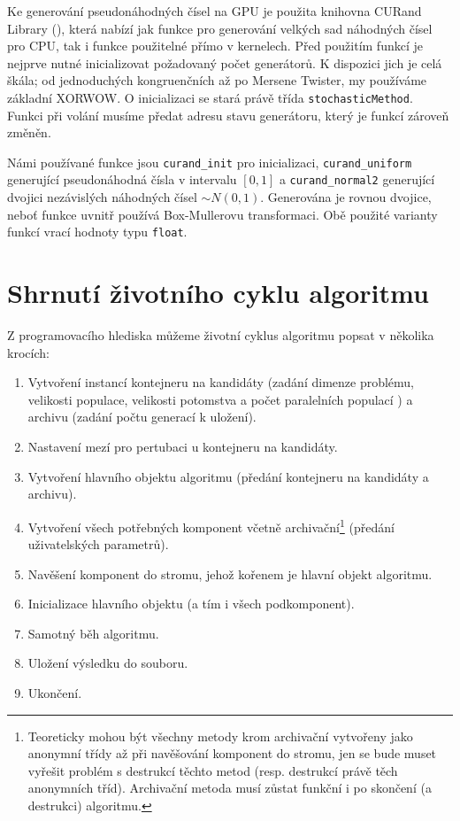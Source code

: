 Ke generování pseudonáhodných čísel na GPU je použita knihovna CURand Library (), která nabízí jak funkce pro generování velkých sad náhodných čísel pro CPU, tak i funkce použitelné přímo v kernelech. Před použitím funkcí je nejprve nutné inicializovat požadovaný počet generátorů. K dispozici jich je celá škála; od jednoduchých kongruenčních až po Mersene Twister, my používáme základní XORWOW. O inicializaci se stará právě třída \texttt{stochasticMethod}. Funkci při volání musíme předat adresu stavu generátoru, který je funkcí zároveň změněn.

Námi používané funkce jsou \texttt{curand\_init} pro inicializaci, \texttt{curand\_uniform} generující pseudonáhodná čísla v intervalu $[0,1]$ a \texttt{curand\_normal2} generující dvojici nezávislých náhodných čísel $\sim N(0,1)$. Generována je rovnou dvojice, neboť funkce uvnitř používá Box-Mullerovu transformaci. Obě použité varianty funkcí vrací hodnoty typu \texttt{float}.

\section{Shrnutí životního cyklu algoritmu}

Z programovacího hlediska můžeme životní cyklus algoritmu popsat v několika krocích:
\begin{enumerate}
  \item Vytvoření instancí kontejneru na kandidáty (zadání dimenze problému, velikosti populace, velikosti potomstva a počet paralelních populací ) a archivu (zadání počtu generací k uložení).
  \item Nastavení mezí pro pertubaci u kontejneru na kandidáty.
  \item Vytvoření hlavního objektu algoritmu (předání kontejneru na kandidáty a archivu).
  \item Vytvoření všech potřebných komponent včetně archivační\footnote{Teoreticky mohou být všechny metody krom archivační vytvořeny jako anonymní třídy až při navěšování komponent do stromu, jen se bude muset vyřešit problém s destrukcí těchto metod (resp. destrukcí právě těch anonymních tříd). Archivační metoda musí zůstat funkční i po skončení (a destrukci) algoritmu.} (předání uživatelských parametrů).
  \item Navěšení komponent do stromu, jehož kořenem je hlavní objekt algoritmu.
  \item Inicializace hlavního objektu (a tím i všech podkomponent).
  \item Samotný běh algoritmu.
  \item Uložení výsledku do souboru.
  \item Ukončení.
\end{enumerate}

